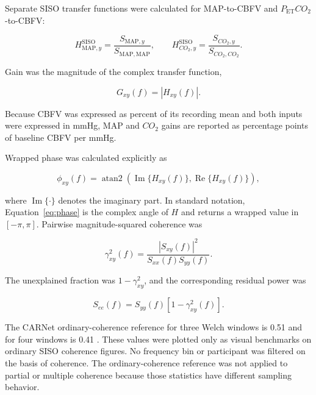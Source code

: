 \documentclass[12pt]{article}
\newcommand{\PETCOtwo}{P_{\mathrm{ET}}CO_2}
\newcommand{\MAP}{\mathrm{MAP}}
\newcommand{\COtwo}{CO_2}
\newcommand{\Real}{\operatorname{Re}}
\newcommand{\Imag}{\operatorname{Im}}
\newcommand{\atanTwo}{\operatorname{atan2}}
\begin{document}
Separate SISO transfer functions were calculated for MAP-to-CBFV and
$\PETCOtwo$-to-CBFV:

\begin{equation}
    H_{\MAP,y}^{\mathrm{SISO}}
    =\frac{S_{\MAP,y}}{S_{\MAP,\MAP}},
    \qquad
    H_{\COtwo,y}^{\mathrm{SISO}}
    =\frac{S_{\COtwo,y}}{S_{\COtwo,\COtwo}}.
\end{equation}

Gain was the magnitude of the complex transfer function,

\begin{equation}
    G_{xy}(f)=\left|H_{xy}(f)\right|.
    \label{eq:gain}
\end{equation}

Because CBFV was expressed as percent of its recording mean and both inputs
were expressed in mmHg, MAP and $\COtwo$ gains are reported as percentage
points of baseline CBFV per mmHg.

Wrapped phase was calculated explicitly as

\begin{equation}
    \phi_{xy}(f)=\atanTwo\!\left(
    \Imag\{H_{xy}(f)\},
    \Real\{H_{xy}(f)\}\right),
    \label{eq:phase}
\end{equation}

where $\Imag\{\cdot\}$ denotes the imaginary part. In standard notation,
Equation~\ref{eq:phase} is the complex angle of $H$ and
returns a wrapped value in $[-\pi,\pi]$. Pairwise magnitude-squared coherence
was

\begin{equation}
    \gamma^2_{xy}(f)=
    \frac{|S_{xy}(f)|^2}{S_{xx}(f)S_{yy}(f)}.
    \label{eq:ordinary_coherence}
\end{equation}

The unexplained fraction was $1-\gamma^2_{xy}$, and the corresponding residual
power was

\begin{equation}
    S_{ee}(f)=S_{yy}(f)\left[1-\gamma^2_{xy}(f)\right].
\end{equation}

The CARNet ordinary-coherence reference for three Welch windows is 0.51 and
for four windows is 0.41 \cite{Panerai2023}. These values were plotted only as
visual benchmarks on ordinary SISO coherence figures. No frequency bin or
participant was filtered on the basis of coherence. The ordinary-coherence
reference was not applied to partial or multiple coherence because those
statistics have different sampling behavior.
\end{document}
